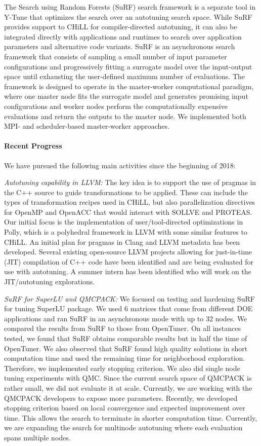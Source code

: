 The Search using Random Forests (SuRF) search framework is a separate tool in Y-Tune that optimizes the search over an autotuning search space.  While
SuRF provides support to CHiLL for compiler-directed autotuning, it can
also be integrated directly with applications and runtimes to search over
application parameters and alternative code variants.
SuRF is an asynchronous search framework that consists of sampling a small number of input parameter configurations and progressively fitting a surrogate model over the input-output space until exhausting the user-defined maximum number of evaluations. The framework is designed to operate in the master-worker computational paradigm, where one master node fits the surrogate model and generates promising input configurations and worker nodes perform the computationally expensive evaluations and return the outputs to the master node. We implemented both MPI- and scheduler-based master-worker approaches.


\paragraph{Recent Progress}


We have pursued the following main activities since the beginning of 2018:

\textit{Autotuning capability in LLVM:}
The key idea is to support the use of pragmas in the C++ source to guide transformations to be applied. These can include the types of transformation recipes used in CHiLL, but also parallelization directives for OpenMP and OpenACC that would interact with SOLLVE and PROTEAS. Our initial focus is the implementation of user/tool-directed optimizations in Polly, which is a polyhedral framework in LLVM with some similar features to CHiLL. An initial plan for pragmas in Clang and LLVM metadata has been developed. Several existing open-source LLVM projects allowing for just-in-time (JIT) compilation of C++ code have been identified and are being evaluated for use with autotuning. A summer intern has been identified who will work on the JIT/autotuning explorations.

\vspace*{.1in}
\noindent
\textit{SuRF for SuperLU and QMCPACK:}
We focused on testing and hardening SuRF for tuning SuperLU package. We used 6 matrices that come from different DOE applications and ran SuRF in an asynchronous mode with up to 32 nodes. We compared the results from SuRF to those from OpenTuner. On all instances tested, we found that SuRF obtains comparable results but in half the time of OpenTuner. We also observed that SuRF found high quality solutions in short computation time and used the remaining time for neighborhood exploration. Therefore, we implemented early stopping criterion. We also did single node tuning experiments with QMC. Since the current search space of QMCPACK is rather small, we did not evaluate it at scale. Currently, we are working with the QMCPACK developers to expose more parameters.
Recently, we developed stopping criterion based on local convergence and expected improvement over time. This allows the search to terminate in shorter computation time. Currently, we are expanding the search for multinode autotuning where each evaluation spans multiple nodes.

